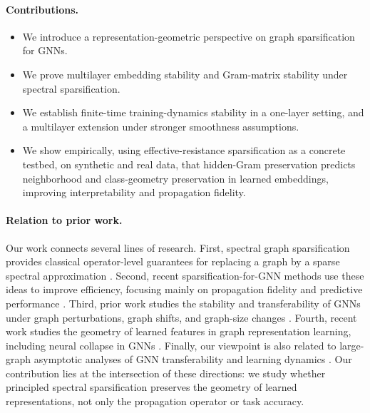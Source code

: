 \documentclass{article}
\begin{document}

\paragraph{Contributions.}
\begin{itemize}
    \item We introduce a representation-geometric perspective on graph sparsification for GNNs.
    \item We prove multilayer embedding stability and Gram-matrix stability under spectral sparsification.
    \item We establish finite-time training-dynamics stability in a one-layer setting, and a multilayer extension under stronger smoothness assumptions.
    \item We show empirically, using effective-resistance sparsification as a concrete testbed, on  synthetic and real data, that hidden-Gram preservation predicts neighborhood and class-geometry preservation in learned embeddings, improving interpretability and propagation fidelity.
\end{itemize}

\paragraph{Relation to prior work.}
Our work connects several lines of research. First, spectral graph sparsification provides classical
operator-level guarantees for replacing a graph by a sparse spectral approximation
\citep{spielman2011graph}. Second, recent sparsification-for-GNN methods use these ideas to
improve efficiency, focusing mainly on propagation fidelity and predictive performance
\citep{ding2025largescale}. Third, prior work studies the stability and transferability of GNNs
under graph perturbations, graph shifts, and graph-size changes
\citep{gama2020stability,ruiz2021gnnprocieee,ruiz2023transferability}. Fourth, recent work
studies the geometry of learned features in graph representation learning, including neural collapse
in GNNs \citep{kothapalli2023neuralcollapsegnn,papyan2020neuralcollapse}. Finally, our viewpoint is
also related to large-graph asymptotic analyses of GNN transferability and learning dynamics
\citep{krishnagopal2023gntk}. Our contribution lies at the intersection of these directions: we
study whether principled spectral sparsification preserves the geometry of learned representations,
not only the propagation operator or task accuracy.
\end{document}

